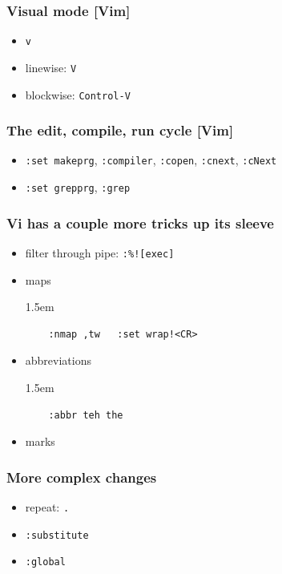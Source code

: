 \documentclass[%
        hyperref={%
                pdfauthor={Zakariyya Mughal},%
                pdfpagemode={None},pdfpagelayout={SinglePage}}%
        xcolor={x11names},%
]{beamer}
\newenvironment{indented}{\begin{adjustwidth}{1.5em}{}}{\end{adjustwidth}}
\begin{document}
\begin{frame}
\frametitle{Visual mode [Vim]}
\begin{itemize}
\item \Verb+v+
\item linewise: \Verb+V+
\item blockwise: \Verb+Control-V+
\end{itemize}
\end{frame}


\begin{frame}
\frametitle{The edit, compile, run cycle [Vim]}
\begin{itemize}
\item \Verb+:set makeprg+, \Verb+:compiler+, \Verb+:copen+,
\Verb+:cnext+, \Verb+:cNext+
\item \Verb+:set grepprg+, \Verb+:grep+
\end{itemize}
\end{frame}

\begin{frame}[fragile]
\frametitle{Vi has a couple more tricks up its sleeve}
\begin{itemize}
\item filter through pipe: \Verb+:%![exec]+
\item maps
	\begin{indented}
	\begin{Verbatim}
	:nmap ,tw	:set wrap!<CR>
	\end{Verbatim}
	\end{indented}
\item abbreviations
	\begin{indented}
	\begin{Verbatim}
	:abbr teh the
	\end{Verbatim}
	\end{indented}
\item marks
\end{itemize}
\end{frame}

\begin{frame}
\frametitle{More complex changes}
\begin{itemize}
\item repeat: \Verb+.+
\item \Verb+:substitute+
\item \Verb+:global+
\end{itemize}
\end{frame}
\end{document}
